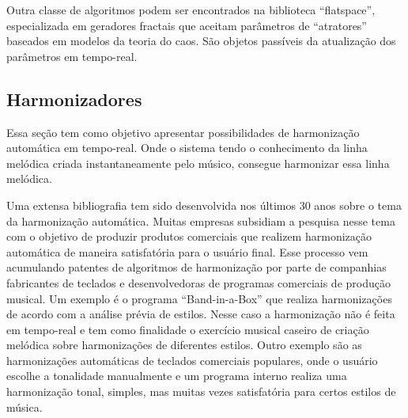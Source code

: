 \documentclass{ppgmus}
\begin{document}
Outra classe de algoritmos podem ser encontrados na biblioteca ``flatspace'', especializada
em geradores fractais que aceitam parâmetros de ``atratores'' baseados em modelos da teoria
do caos. São objetos passíveis da atualização dos parâmetros em tempo-real. 
% 




\subsection{Harmonizadores}


Essa seção tem como objetivo apresentar possibilidades de harmonização automática em tempo-real.
Onde o sistema tendo o conhecimento da linha melódica criada instantaneamente pelo músico, consegue
harmonizar essa linha melódica.

Uma extensa bibliografia tem sido desenvolvida nos últimos 30 anos sobre o tema da harmonização automática.
Muitas empresas subsidiam a pesquisa nesse tema com o objetivo de produzir produtos comerciais que realizem
harmonização automática de maneira satisfatória para o usuário final. Esse processo vem acumulando patentes
de algoritmos de harmonização por parte de companhias fabricantes de teclados e desenvolvedoras de programas comerciais
de produção musical. Um exemplo é o programa ``Band-in-a-Box'' que realiza harmonizações de acordo com
a análise prévia de estilos. Nesse caso a harmonização não é feita em tempo-real e tem como finalidade
o exercício musical caseiro de criação melódica sobre harmonizações de diferentes estilos.
Outro exemplo são as harmonizações automáticas de teclados comerciais populares, onde o usuário escolhe
a tonalidade manualmente e um programa interno realiza uma harmonização tonal, simples, mas muitas vezes 
satisfatória para certos estilos de música.
\end{document}
